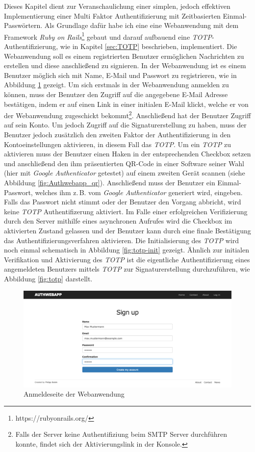 \documentclass[11pt,a4paper,ngerman]{scrreprt}
\begin{document}
Dieses Kapitel dient zur Veranschaulichung einer simplen, jedoch effektiven Implementierung einer Multi Faktor Authentifizierung mit Zeitbasierten Einmal-Passwörtern. Als Grundlage dafür habe ich eine eine Webanwendung mit dem Framework \textit{Ruby on Rails}\footnote{https://rubyonrails.org/} gebaut und darauf aufbauend eine \textit{TOTP}-Authentifizierung, wie in Kapitel \ref{sec:TOTP} beschrieben, implementiert. Die Webanwendung soll es einem registrierten Benutzer ermöglichen Nachrichten zu erstellen und diese anschließend zu signieren. In der Webanwendung ist es einem Benutzer möglich sich mit Name, E-Mail und Passwort zu registrieren, wie in Abbildung \ref{fig:Authwebapp_login} gezeigt. Um sich erstmals in der Webanwendung anmelden zu können, muss der Benutzer den Zugriff auf die angegebene E-Mail Adresse bestätigen, indem er auf einen Link in einer initialen E-Mail klickt, welche er von der Webanwendung zugeschickt bekommt\footnote{Falls der Server keine Authentifiziung beim SMTP Server durchführen konnte, findet sich der Aktivierungslink in der Konsole.}. Anschließend hat der Benutzer Zugriff auf sein Konto. Um jedoch Zugriff auf die Signaturerstellung zu haben, muss der Benutzer jedoch zusätzlich den zweiten Faktor der Authentifizierung in den Kontoeinstellungen aktivieren, in diesem Fall das \textit{TOTP}. Um ein \textit{TOTP} zu aktivieren muss der Benutzer einen Haken in der entsprechenden Checkbox setzen und anschließend den ihm präsentierten QR-Code in einer Software seiner Wahl (hier mit \textit{Google Authenticator} getestet) auf einem zweiten Gerät scannen (siehe Abbildung \ref{fig:Authwebapp_qr}). Anschließend muss der Benutzer ein Einmal-Passwort, welches ihm z.\,B. vom \textit{Google Authenticator} generiert wird, eingeben. Falls das Passwort nicht stimmt oder der Benutzer den Vorgang abbricht, wird keine \textit{TOTP} Authentifizerung aktiviert. Im Falle einer erfolgreichen Verifizierung durch den Server mithilfe eines asynchronen Aufrufes wird die Checkbox im aktivierten Zustand gelassen und der Benutzer kann durch eine finale Bestätigung das Authentifizierungsverfahren aktivieren. Die Initialisierung des \textit{TOTP} wird noch einmal schematisch in Abbildung \ref{fig:totp-init} gezeigt. Ähnlich zur initialen Verifikation und Aktivierung des \textit{TOTP} ist die eigentliche Authentifizierung eines angemeldeten Benutzers mittels \textit{TOTP} zur Signaturerstellung durchzuführen, wie Abbildung \ref{fig:totp} darstellt.
\begin{figure}[htbp]
    \centering
        \includegraphics[width=\textwidth]{Abbildungen/Authwebapp_login}
    \caption{Anmeldeseite der Webanwendung}
    \label{fig:Authwebapp_login}
\end{figure}
\end{document}
